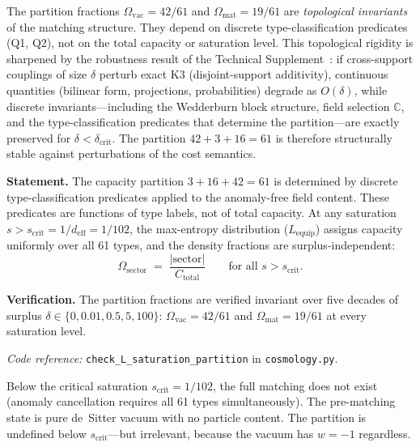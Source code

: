 \documentclass[11pt]{article}
\newcommand{\coderef}[2]{\smallskip\noindent\textit{Code reference:} \texttt{#1} in \texttt{#2}.}
\begin{document}
The partition fractions $\Omega_{\mathrm{vac}} = 42/61$ and $\Omega_{\mathrm{mat}} = 19/61$ are \emph{topological invariants} of the matching structure.  They depend on discrete type-classification predicates (Q1, Q2), not on the total capacity or saturation level.  This topological rigidity is sharpened by the robustness result of the Technical Supplement~\cite{BrookeSupplement}: if cross-support couplings of size $\delta$ perturb exact K3 (disjoint-support additivity), continuous quantities (bilinear form, projections, probabilities) degrade as $O(\delta)$, while discrete invariants---including the Wedderburn block structure, field selection $\mathbb{C}$, and the type-classification predicates that determine the partition---are exactly preserved for $\delta < \delta_{\mathrm{crit}}$.  The partition $42 + 3 + 16 = 61$ is therefore structurally stable against perturbations of the cost semantics.

\begin{tcolorbox}[apfbox, title={$L_{\mathrm{sat,part}}$ (Saturation-Independent Partition)}]
\textbf{Statement.}  The capacity partition $3 + 16 + 42 = 61$ is determined by discrete type-classification predicates applied to the anomaly-free field content.  These predicates are functions of type labels, not of total capacity.  At any saturation $s > s_{\mathrm{crit}} = 1/d_{\mathrm{eff}} = 1/102$, the max-entropy distribution ($L_{\mathrm{equip}}$) assigns capacity uniformly over all 61 types, and the density fractions are surplus-independent:
\begin{equation}
\Omega_{\mathrm{sector}} \;=\; \frac{|\mathrm{sector}|}{C_{\mathrm{total}}} \qquad \text{for all } s > s_{\mathrm{crit}}.
\label{eq:omega_sector}
\end{equation}

\smallskip\noindent\textbf{Verification.}  The partition fractions are verified invariant over five decades of surplus $\delta \in \{0, 0.01, 0.5, 5, 100\}$: $\Omega_{\mathrm{vac}} = 42/61$ and $\Omega_{\mathrm{mat}} = 19/61$ at every saturation level.

\coderef{check\_L\_saturation\_partition}{cosmology.py}
\end{tcolorbox}

Below the critical saturation $s_{\mathrm{crit}} = 1/102$, the full matching does not exist (anomaly cancellation requires all 61 types simultaneously).  The pre-matching state is pure de~Sitter vacuum with no particle content.  The partition is undefined below $s_{\mathrm{crit}}$---but irrelevant, because the vacuum has $w = -1$ regardless.
\end{document}
